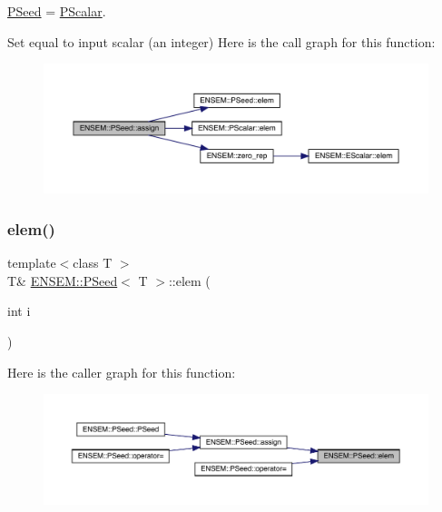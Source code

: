 \mbox{\hyperlink{classENSEM_1_1PSeed}{P\+Seed}} = \mbox{\hyperlink{classENSEM_1_1PScalar}{P\+Scalar}}. 

Set equal to input scalar (an integer) Here is the call graph for this function\+:
\nopagebreak
\begin{figure}[H]
\begin{center}
\leavevmode
\includegraphics[width=350pt]{dc/d14/classENSEM_1_1PSeed_a8d74bd21af23dfb165937c3bb546ea8f_cgraph}
\end{center}
\end{figure}
\mbox{\label{classENSEM_1_1PSeed_aeed16139a22df65e16fd064b7808c49a}} 
\subsubsection{\texorpdfstring{elem()}{elem()}\hspace{0.1cm}{\footnotesize\ttfamily [1/4]}}
{\footnotesize\ttfamily template$<$class T $>$ \\
T\& \mbox{\hyperlink{classENSEM_1_1PSeed}{E\+N\+S\+E\+M\+::\+P\+Seed}}$<$ T $>$\+::elem (\begin{DoxyParamCaption}\item[{int}]{i }\end{DoxyParamCaption})\hspace{0.3cm}{\ttfamily [inline]}}

Here is the caller graph for this function\+:\nopagebreak
\begin{figure}[H]
\begin{center}
\leavevmode
\includegraphics[width=350pt]{dc/d14/classENSEM_1_1PSeed_aeed16139a22df65e16fd064b7808c49a_icgraph}
\end{center}
\end{figure}
\mbox{\label{classENSEM_1_1PSeed_aeed16139a22df65e16fd064b7808c49a}} 
